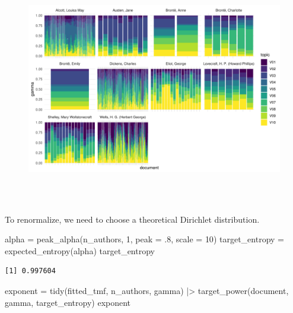 \documentclass[
]{article}
\newenvironment{Shaded}{\begin{snugshade}}{\end{snugshade}}
\newcommand{\AttributeTok}[1]{\textcolor[rgb]{0.40,0.45,0.13}{#1}}
\newcommand{\DecValTok}[1]{\textcolor[rgb]{0.68,0.00,0.00}{#1}}
\newcommand{\FunctionTok}[1]{\textcolor[rgb]{0.28,0.35,0.67}{#1}}
\newcommand{\NormalTok}[1]{\textcolor[rgb]{0.00,0.23,0.31}{#1}}
\newcommand{\OtherTok}[1]{\textcolor[rgb]{0.00,0.23,0.31}{#1}}
\newcommand{\SpecialCharTok}[1]{\textcolor[rgb]{0.37,0.37,0.37}{#1}}
\newcommand{\StringTok}[1]{\textcolor[rgb]{0.13,0.47,0.30}{#1}}
\begin{document}
\begin{figure}[H]

{\centering \includegraphics[width=6in,height=4in]{paper_files/figure-pdf/unnamed-chunk-48-1.pdf}

}

\end{figure}

To renormalize, we need to choose a theoretical Dirichlet distribution.

\begin{Shaded}
\begin{Highlighting}[]
\NormalTok{alpha }\OtherTok{=} \FunctionTok{peak\_alpha}\NormalTok{(n\_authors, }\DecValTok{1}\NormalTok{, }\AttributeTok{peak =}\NormalTok{ .}\DecValTok{8}\NormalTok{, }\AttributeTok{scale =} \DecValTok{10}\NormalTok{)}
\NormalTok{target\_entropy }\OtherTok{=} \FunctionTok{expected\_entropy}\NormalTok{(alpha)}
\NormalTok{target\_entropy}
\end{Highlighting}
\end{Shaded}

\begin{verbatim}
[1] 0.997604
\end{verbatim}

\begin{Shaded}
\begin{Highlighting}[]
\NormalTok{exponent }\OtherTok{=} \FunctionTok{tidy}\NormalTok{(fitted\_tmf, n\_authors, }\StringTok{\textquotesingle{}gamma\textquotesingle{}}\NormalTok{) }\SpecialCharTok{|\textgreater{}} 
    \FunctionTok{target\_power}\NormalTok{(document, gamma, target\_entropy)}
\NormalTok{exponent}
\end{Highlighting}
\end{Shaded}
\end{document}
